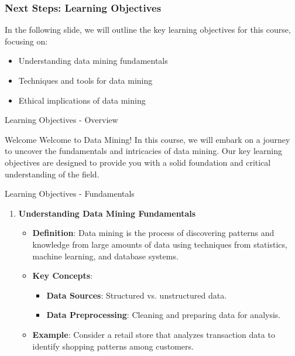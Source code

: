 \documentclass[aspectratio=169]{beamer}
\begin{document}
\begin{frame}[fragile]
    \frametitle{Next Steps: Learning Objectives}
    In the following slide, we will outline the key learning objectives for this course, focusing on:
    \begin{itemize}
        \item Understanding data mining fundamentals
        \item Techniques and tools for data mining
        \item Ethical implications of data mining
    \end{itemize}
\end{frame}

\begin{frame}[fragile]{Learning Objectives - Overview}
    \begin{block}{Welcome}
        Welcome to Data Mining! In this course, we will embark on a journey to uncover the fundamentals and intricacies of data mining. Our key learning objectives are designed to provide you with a solid foundation and critical understanding of the field.
    \end{block}
\end{frame}

\begin{frame}[fragile]{Learning Objectives - Fundamentals}
    \begin{enumerate}
        \item \textbf{Understanding Data Mining Fundamentals}
        \begin{itemize}
            \item \textbf{Definition}: Data mining is the process of discovering patterns and knowledge from large amounts of data using techniques from statistics, machine learning, and database systems.
            \item \textbf{Key Concepts}:
            \begin{itemize}
                \item \textbf{Data Sources}: Structured vs. unstructured data.
                \item \textbf{Data Preprocessing}: Cleaning and preparing data for analysis.
            \end{itemize}
            \item \textbf{Example}: Consider a retail store that analyzes transaction data to identify shopping patterns among customers.
        \end{itemize}
    \end{enumerate}
\end{frame}
\end{document}
